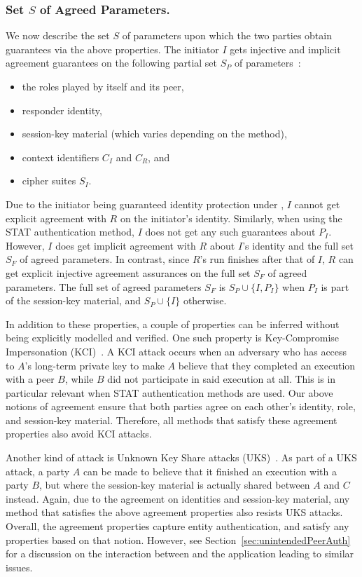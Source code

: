 \documentclass[runningheads]{llncs}
\newcommand{\mConstStyle}[1]{\textsf{#1}}
\newcommand{\mMethodStyle}[1]{\mConstStyle{#1}}
\newcommand{\mProtocolStyle}[1]{\text{#1}}
\newcommand{\mEdhoc}{\mProtocolStyle{EDHOC}}
\newcommand{\mStat}{\mMethodStyle{STAT}}
\newcommand{\mSuites}{\ensuremath{S_I}}
\newcommand{\mCi}{\ensuremath{C_I}}
\newcommand{\mCr}{\ensuremath{C_R}}
\begin{document}
\subsubsection{Set $S$ of Agreed Parameters.}
\label{sec:agreedParams}
We now describe the set $S$ of parameters upon which the two parties obtain
guarantees via the above properties.
%
The initiator $I$ gets injective and implicit agreement guarantees on the
following partial set $S_P$ of parameters~\cite{Norr21}:
\begin{itemize}
    \item the roles played by itself and its peer,
    \item responder identity,
    \item session-key material (which varies depending on the \mEdhoc{} 
method),
    \item context identifiers \mCi{} and \mCr{}, and
    \item cipher suites \mSuites{}.
\end{itemize}
%

Due to the initiator being guaranteed identity protection under \mEdhoc{}, $I$
cannot get explicit agreement with $R$ on the initiator's identity.
%
Similarly, when using the \mStat{} authentication method, $I$ does not get 
any
such guarantees about $P_{I}$.
%
However, $I$ does get implicit agreement with $R$ about $I$'s identity and the
full set $S_{F}$ of agreed parameters.
%
In contrast, since $R$'s run finishes after that of $I$, $R$ can get explicit
injective agreement assurances on the full set $S_{F}$ of agreed parameters.
%
The full set of agreed parameters $S_F$ is $S_P \cup \{I, P_I\}$ when $P_I$
is part of the session-key material, and $S_P \cup \{I\}$ otherwise.
%

In addition to these properties, a couple of properties can be inferred
without being explicitly modelled and verified.
%
One such property is Key-Compromise Impersonation
(KCI)~\cite{DBLP:conf/ima/Blake-WilsonJM97}.
%
A KCI attack occurs when an adversary who has access to $A$'s long-term 
private
key to make $A$ believe that they completed an execution with a peer $B$,
while $B$ did not participate in said execution at all.
%
This is in particular relevant when \mStat{} authentication methods are used.
%
Our above notions of agreement ensure that both parties agree on each
other's identity, role, and session-key material.
%
Therefore, all \mEdhoc{} methods that satisfy these agreement properties also
avoid KCI attacks.
%

Another kind of attack is Unknown Key Share attacks
(UKS)~\cite{DBLP:conf/ima/Blake-WilsonJM97}.
%
As part of a UKS attack, a party $A$ can be made to believe that it finished
an execution with a party $B$, but where the session-key material is actually
shared between $A$ and $C$ instead.
%
Again, due to the agreement on identities and session-key material, any 
method
that satisfies the above agreement properties also resists UKS attacks.
%
Overall, the agreement properties capture entity authentication,
and satisfy any properties based on that notion.
%
However, see Section~\ref{sec:unintendedPeerAuth} for a discussion on the
interaction between \mEdhoc{} and the application leading to similar issues.
%
\end{document}
